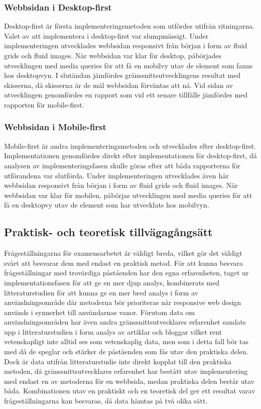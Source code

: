 \documentclass[11pt]{article}
\begin{document}
\subsubsection{Webbsidan i Desktop-first}
Desktop-first är första implementeringsmetoden som utfördes utifrån ritningarna. Valet av att implementera i desktop-first var slumpmässigt. Under implementeringen utvecklades webbsidan responsivt från början i form av fluid grids och fluid images. När webbsidan var klar för desktop, påbörjades utvecklingen med media queries för att få en mobilvy utav de element som fanns hos desktopvyn. I slutändan jämfördes gränssnittsutvecklingens resultat med skisserna, då skisserna är de mål webbsidan förväntas att nå. Vid sidan av utvecklingen genomfördes en rapport som vid ett senare tillfälle jämfördes med rapporten för mobile-first.

\subsubsection{Webbsidan i Mobile-first}
Mobile-first är andra implementeringsmetoden och utvecklades efter desktop-first. Implementationen genomfördes direkt efter implementationen för desktop-first, då analysen av implementeringsfasen skulle göras efter att båda rapporterna för utförandena var slutförda. Under implementeringen utvecklades även här webbsidan responsivt från början i form av fluid grids och fluid images. När webbsidan var klar för mobilen, påbörjas utvecklingen med media queries för att få en desktopvy utav de element som har utvecklats hos mobilvyn.


\subsection{Praktisk- och teoretisk tillvägagångsätt}
Frågeställningarna för examensarbetet är väldigt breda, vilket gör det väldigt svårt att besvarar dem med endast en praktisk metod. För att kunna besvara frågeställningar med trovärdiga påståenden har den egna erfarenheten, taget ur implementationsfasen för att ge en mer djup analys, kombinerats med litteraturstudien för att kunna ge en mer bred analys i form av användningsområde där metoderna bör prioriteras när responsive web design används i synnerhet till användarnas vanor. Förutom data om användningsområden har även andra gränssnittsutvecklares erfarenhet samlats upp i litteraturstudien i form analys av artiklar och bloggar vilket rent vetenskapligt inte alltid ses som vetenskaplig data, men som i detta fall bör tas med då de speglar och stärker de påståenden som fås utav den praktiska delen. Dock är data utifrån litteraturstudie inte direkt kopplat till den praktiska metoden, då gränssnittsutvecklares erfarenhet har bestått utav implementering med endast en av metoderna för en webbsida, medan praktiska delen består utav båda. Kombinationen utav en praktiskt och en teoretisk del ger ett resultat varav frågeställningarna kan besvaras, då data hämtas på två olika sätt.
\end{document}
